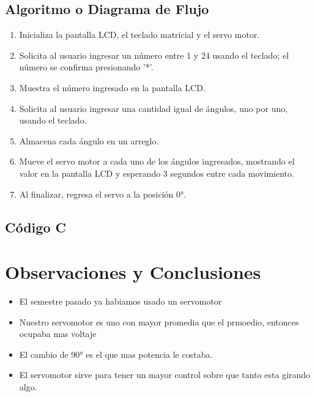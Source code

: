 \documentclass[11pt]{scrartcl}
\begin{document}
\subsection{Algoritmo o Diagrama de Flujo}

\begin{enumerate}
  \item Inicializa la pantalla LCD, el teclado matricial y el servo motor.
\item Solicita al usuario ingresar un número entre 1 y 24 usando el teclado; el número se confirma presionando '*'.
\item Muestra el número ingresado en la pantalla LCD.
\item Solicita al usuario ingresar una cantidad igual de ángulos, uno por uno, usando el teclado.
\item Almacena cada ángulo en un arreglo.
\item Mueve el servo motor a cada uno de los ángulos ingresados, mostrando el valor en la pantalla LCD y esperando 3 segundos entre cada movimiento.
\item Al finalizar, regresa el servo a la posición 0°.
\end{enumerate}

\subsection{ Código C}




\section{Observaciones y Conclusiones}

\begin{itemize}
    \item El semestre pasado ya habiamos usado un servomotor 
    \item Nuestro servomotor es uno con mayor promedia que el prmoedio, entonces ocupaba mas voltaje 
    \item El cambio de 90° es el que mas potencia le costaba.
    \item El servomotor sirve para tener un mayor control sobre que tanto esta girando algo. 
\end{itemize}
  

    
\end{document}
